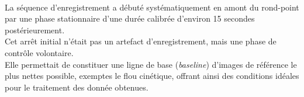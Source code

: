 \documentclass[12pt,a4paper,oneside]{report}
\begin{document}
\paragraph{}
La séquence d'enregistrement a débuté systématiquement en amont du rond-point par une phase stationnaire d'une durée calibrée d'environ 15 secondes postérieurement.\\
 Cet arrêt initial n'était pas un artefact d'enregistrement, mais une phase de contrôle volontaire.\\
\hspace*{.5cm}Elle permettait de constituer une ligne de base (\textit{baseline}) d'images de référence le plus nettes possible, exemptes le flou cinétique, offrant ainsi des conditions idéales pour le traitement des donnée obtenues.\\

\newpage
\end{document}
